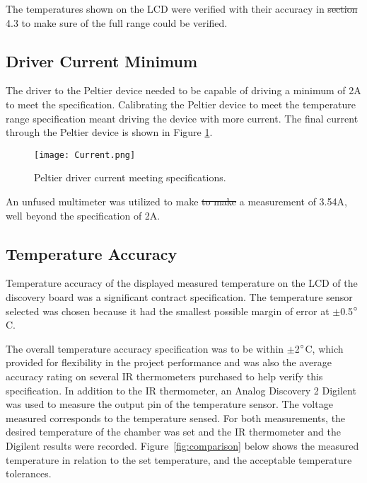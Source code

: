 \documentclass[11pt,letter]{article}
\providecommand{\DIFadd}[1]{{\protect\color{blue}\uwave{#1}}} %
\providecommand{\DIFdel}[1]{{\protect\color{red}\sout{#1}}}                      %
\providecommand{\DIFaddbegin}{} %
\providecommand{\DIFaddend}{} %
\providecommand{\DIFdelbegin}{} %
\providecommand{\DIFdelend}{} %
\newcommand{\DIFscaledelfig}{0.5}
\newlength{\DIFdelgraphicswidth} %
\newlength{\DIFdelgraphicsheight} %
\newcommand{\DIFaddincludegraphics}[2][]{{\color{blue}\fbox{\DIFOincludegraphics[#1]{#2}}}} %
\newcommand{\DIFdelincludegraphics}[2][]{%
\sbox{\DIFdelgraphicsbox}{\DIFOincludegraphics[#1]{#2}}%
\settoboxwidth{\DIFdelgraphicswidth}{\DIFdelgraphicsbox} %
\settoboxtotalheight{\DIFdelgraphicsheight}{\DIFdelgraphicsbox} %
\scalebox{\DIFscaledelfig}{%
\parbox[b]{\DIFdelgraphicswidth}{\usebox{\DIFdelgraphicsbox}\\[-\baselineskip] \rule{\DIFdelgraphicswidth}{0em}}\llap{\resizebox{\DIFdelgraphicswidth}{\DIFdelgraphicsheight}{%
\setlength{\unitlength}{\DIFdelgraphicswidth}%
\begin{picture}(1,1)%
\thicklines\linethickness{2pt} %
{\color[rgb]{1,0,0}\put(0,0){\framebox(1,1){}}}%
{\color[rgb]{1,0,0}\put(0,0){\line( 1,1){1}}}%
{\color[rgb]{1,0,0}\put(0,1){\line(1,-1){1}}}%
\end{picture}%
}\hspace*{3pt}}} %
} %
\DeclareRobustCommand{\DIFaddbegin}{\DIFOaddbegin \let\includegraphics\DIFaddincludegraphics} %
\DeclareRobustCommand{\DIFaddend}{\DIFOaddend \let\includegraphics\DIFOincludegraphics} %
\DeclareRobustCommand{\DIFdelbegin}{\DIFOdelbegin \let\includegraphics\DIFdelincludegraphics} %
\DeclareRobustCommand{\DIFdelend}{\DIFOaddend \let\includegraphics\DIFOincludegraphics} %
\begin{document}
The temperatures shown on the LCD were verified with their accuracy in \DIFdelbegin \DIFdel{section }\DIFdelend \DIFaddbegin \DIFadd{Section }\DIFaddend 4.3 to make sure of the full range could be verified.

\subsection{Driver Current Minimum}

The driver to the Peltier device needed to be capable of driving a minimum of 2A to meet the specification. Calibrating the Peltier device to meet the temperature range specification meant driving the device with more current. The final current through the Peltier device is shown in Figure \ref{fig:current}.

\begin{figure}[H]
    \centering
    \texttt{[image: Current.png]}
    \caption{Peltier driver current meeting specifications.}
    \label{fig:current}
\end{figure}

An unfused multimeter was utilized to make \DIFdelbegin \DIFdel{to make }\DIFdelend a measurement of 3.54A, well beyond the specification of 2A.

\subsection{Temperature Accuracy}

Temperature accuracy of the displayed measured temperature on the LCD of the discovery board was a significant contract specification. The temperature sensor selected was chosen because it had the smallest possible margin of error at $\pm$0.5$\degree$C. 

The overall temperature accuracy specification was to be within $\pm$2$\degree$C, which provided for flexibility in the project performance and was also the average accuracy rating on several IR thermometers purchased to help verify this specification. In addition to the IR thermometer, an Analog Discovery 2 Digilent was used to measure the output pin of the temperature sensor. The voltage measured corresponds to the temperature sensed. For both measurements, the desired temperature of the chamber was set and the IR thermometer and the Digilent results were recorded. Figure~\ref{fig:comparison} below shows the measured temperature in relation to the set temperature, and the acceptable temperature tolerances.
\end{document}
